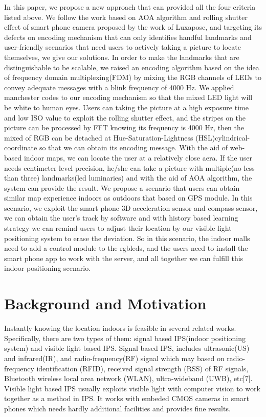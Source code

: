 \documentclass[conference]{IEEEtran}
\begin{document}
In this paper, we propose a new approach that can provided all the four criteria listed above. We follow the work based on AOA algorithm and rolling shutter effect of smart phone camera proposed by the work of Luxapose, and targeting its defects on encoding mechanism that can only identifies handful landmarks and user-friendly scenarios that need users to actively taking a picture to locate themselves, we give our solutions. In order to make the landmarks that are distinguishable to be scalable, we raised an encoding algorithm based on the idea of frequency domain multiplexing(FDM) by mixing the RGB channels of LEDs to convey adequate messages with a blink frequency of 4000 Hz. We applied manchester codes to our encoding mechanism so that the mixed LED light will be white to human eyes. Users can taking the picture at a high exposure time and low ISO value to exploit the rolling shutter effect, and the stripes on the picture can be processed by FFT knowing its frequency is 4000 Hz, then the mixed of RGB can be detached at Hue-Saturation-Lightness (HSL)cylindrical-coordinate so that we can obtain its encoding message. With the aid of web-based indoor maps, we can locate the user at a relatively close aera. If the user needs centimeter level precision, he/she can take a picture with multiple(no less than three) landmarks(led luminaries) and with the aid of AOA algorithm, the system can provide the result. We propose a scenario that users can obtain similar map experience indoors as outdoors that based on GPS module. In this scenario, we exploit the smart phone 3D acceleration sensor and compass sensor, we can obtain the user's track by software and with history based learning strategy we can remind users to adjust their location by our visible light positioning system to erase the deviation. So in this scenario, the indoor malls need to add a control module to the rgbleds, and the users need to install the smart phone app to work with the server, and all together we can fulfill this indoor positioning scenario.
	
\section{\textbf{Background and Motivation}}
Instantly knowing the location indoors is feasible in several related works. Specifically, there are two types of them: signal based IPS(indoor positioning system) and visible light based IPS. Signal based IPS, includes ultrasonic(US) and infrared(IR), and radio-frequency(RF) signal which may based on radio-frequency identification (RFID), received signal strength (RSS) of RF signals, Bluetooth wireless local area network (WLAN), ultra-wideband (UWB), etc[7]. Visible light based IPS usually exploits visible light with computer vision to work together as a method in IPS. It works with embeded CMOS cameras in smart phones which needs hardly additional facilities and provides fine results.
	
\end{document}
